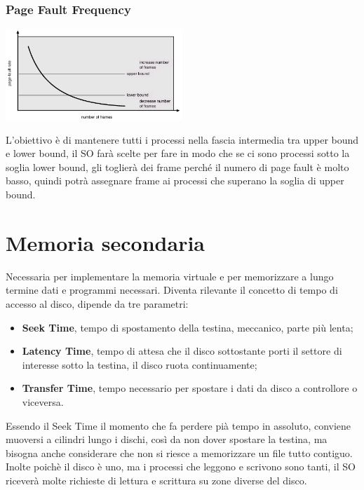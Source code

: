 \documentclass[a4paper, 12pt]{book}
\begin{document}
\subsection{Page Fault Frequency}

\begin{center}
    \includegraphics[width=0.5\textwidth]{pff.png}
\end{center}

L'obiettivo è di mantenere tutti i processi nella fascia 
intermedia tra upper bound e lower bound, il SO 
farà scelte per fare in modo che se ci sono processi 
sotto la soglia lower bound, gli toglierà dei frame perché 
il numero di page fault è molto basso, quindi potrà assegnare 
frame ai processi che superano la soglia di upper bound. 

\chapter{Memoria secondaria}

Necessaria per implementare la memoria virtuale e per memorizzare 
a lungo termine dati e programmi necessari. Diventa rilevante 
il concetto di tempo di accesso al disco, dipende da tre 
parametri:
\begin{itemize}
    \item \textbf{Seek Time}, tempo di spostamento della testina, meccanico, parte più lenta;
    \item \textbf{Latency Time}, tempo di attesa che il disco sottostante porti il settore di interesse sotto la testina, il disco ruota continuamente;
    \item \textbf{Transfer Time}, tempo necessario per spostare i dati da disco a controllore o viceversa.
\end{itemize}
Essendo il Seek Time il momento che fa perdere pià tempo in 
assoluto, conviene muoversi a cilindri lungo i dischi, così 
da non dover spostare la testina, ma bisogna anche considerare 
che non si riesce a memorizzare un file tutto contiguo.
Inolte poichè il disco è uno, ma i processi che leggono e scrivono
sono tanti, il SO riceverà molte richieste di lettura 
e scrittura su zone diverse del disco.
\end{document}
